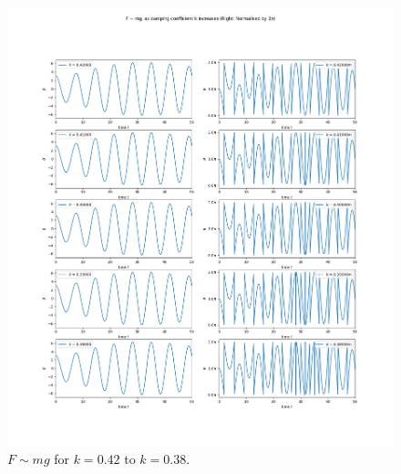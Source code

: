 \documentclass[10pt, twocolumn]{article}
\begin{document}
\begin{figure}
    \centering
    \includegraphics[width = \columnwidth]{Projects/ForcedSimplePendulum/Plots/F~mg as damping coefficient k increases from 0.42 to 0.38.png}
    \caption{$F \sim{mg}$ for $k = 0.42$ to $k = 0.38$.}
    \label{k 0.42 to 0.38}
\end{figure}
\end{document}
